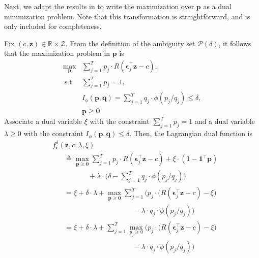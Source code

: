 \documentclass[10pt, twocolumn]{article}
\theoremstyle{plain}
\theoremstyle{definition}
\begin{document}
\begin{appendices}
Next, we adapt the results in \citet{ben2013robust} to write the 
maximization over \(\bm{p}\) as a dual minimization problem. Note that 
this transformation is straightforward, and is only included for completeness.

Fix \((c,\bm{z})\in\mathbb{R}\times\mathcal{Z}\). From the definition of the ambiguity set
\(\mathcal{P}(\delta)\), it follows that the maximization 
problem in \(\bm{p}\) is
\[
\begin{array}{ll}
    \displaystyle \max_{\bm{p}} 
    &\displaystyle \sum_{j=1}^T p_j \cdot R(\bm{\epsilon}_j^\top \bm{z} - c),\\
    \ \text{s.t.} &\displaystyle \sum_{j=1}^T p_j = 1,\\
    &\displaystyle I_\phi(\bm{p},\bm{q}) =
      \sum_{j=1}^T q_j\cdot \phi(p_j/q_j) \leq \delta,\\
    & \bm{p} \geq \bm{0}.
\end{array}
\]
Associate a dual variable \(\xi\) with the constraint \(\sum_{j=1}^T
p_j = 1\) and a dual variable \(\lambda \geq 0\) with the constraint
\(I_\phi(\bm{p},\bm{q}) \leq \delta\). Then, the Lagrangian dual function is
\begin{align}
	&f_{\bm{\epsilon}}^{\delta}(\bm{z}, c, \lambda, \xi)\nonumber\\ 
	&\hspace{20pt} \triangleq \max_{\bm{p}\geq \bm{0}} \sum_{j=1}^T p_j \cdot R(\bm{\epsilon}_j^\top \bm{z} - c) + \xi\cdot (1 - \bm{1}^\top\bm{p}) \nonumber\\[-1ex]
	&\hspace{60pt} + \lambda\cdot\bigg(\delta - \sum_{j=1}^T q_j\cdot \phi(p_j/q_j)\bigg) \nonumber\\
	&\hspace{20pt}= \xi + \delta\cdot\lambda + \max_{\bm{p}\geq \bm{0}} \sum_{j=1}^T \Big(p_j\cdot \big(R(\bm{\epsilon}_j^\top \bm{z} - c) - \xi\big)\nonumber\\[-1ex]
	&\hspace{135pt} - \lambda\cdot q_j\cdot \phi(p_j/q_j)\Big)\nonumber\\
	&\hspace{20pt}= \xi + \delta\cdot\lambda + \sum_{j=1}^T \max_{p_j\geq 0} \Big(p_j\cdot \big(R(\bm{\epsilon}_j^\top \bm{z} - c) - \xi\big)\nonumber\\[-1ex]
	&\hspace{135pt} - \lambda\cdot q_j\cdot \phi(p_j/q_j)\Big)\nonumber\\

\end{align}
\end{appendices}
\end{document}
